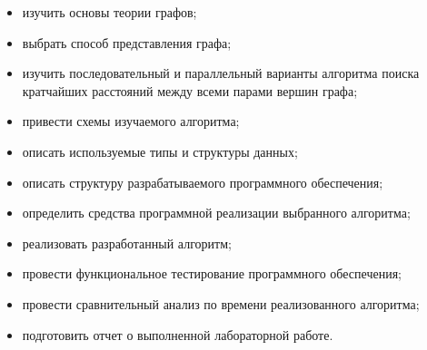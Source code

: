\begin{itemize}
	\item изучить основы теории графов;
	\item выбрать способ представления графа;
	\item изучить последовательный и параллельный варианты алгоритма поиска кратчайших расстояний между всеми парами вершин графа;
	\item привести схемы изучаемого алгоритма;
	\item описать используемые типы и структуры данных;
	\item описать структуру разрабатываемого программного обеспечения;
	\item определить средства программной реализации выбранного алгоритма;
	\item реализовать разработанный алгоритм;
	\item провести функциональное тестирование программного обеспечения;
	\item провести сравнительный анализ по времени реализованного алгоритма;
	\item подготовить отчет о выполненной лабораторной работе.
\end{itemize}